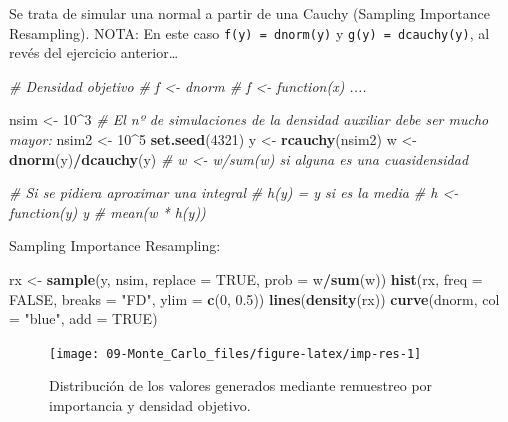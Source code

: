\documentclass[
]{book}
\newenvironment{Shaded}{\begin{snugshade}}{\end{snugshade}}
\newcommand{\CommentTok}[1]{\textcolor[rgb]{0.56,0.35,0.01}{\textit{#1}}}
\newcommand{\DataTypeTok}[1]{\textcolor[rgb]{0.13,0.29,0.53}{#1}}
\newcommand{\DecValTok}[1]{\textcolor[rgb]{0.00,0.00,0.81}{#1}}
\newcommand{\FloatTok}[1]{\textcolor[rgb]{0.00,0.00,0.81}{#1}}
\newcommand{\KeywordTok}[1]{\textcolor[rgb]{0.13,0.29,0.53}{\textbf{#1}}}
\newcommand{\NormalTok}[1]{#1}
\newcommand{\OperatorTok}[1]{\textcolor[rgb]{0.81,0.36,0.00}{\textbf{#1}}}
\newcommand{\OtherTok}[1]{\textcolor[rgb]{0.56,0.35,0.01}{#1}}
\newcommand{\StringTok}[1]{\textcolor[rgb]{0.31,0.60,0.02}{#1}}
\theoremstyle{break}
\theoremstyle{definition}
\theoremstyle{definition}
\theoremstyle{definition}
\theoremstyle{remark}
\begin{document}
Se trata de simular una normal a partir de una Cauchy (Sampling Importance Resampling).
NOTA: En este caso \texttt{f(y)\ =\ dnorm(y)} y \texttt{g(y)\ =\ dcauchy(y)}, al revés del ejercicio anterior\ldots{}

\begin{Shaded}
\begin{Highlighting}[]
\CommentTok{# Densidad objetivo}
\CommentTok{# f <- dnorm # f <- function(x) ....}

\NormalTok{nsim <-}\StringTok{ }\DecValTok{10}\OperatorTok{^}\DecValTok{3}
\CommentTok{# El nº de simulaciones de la densidad auxiliar debe ser mucho mayor:}
\NormalTok{nsim2 <-}\StringTok{ }\DecValTok{10}\OperatorTok{^}\DecValTok{5}
\KeywordTok{set.seed}\NormalTok{(}\DecValTok{4321}\NormalTok{)}
\NormalTok{y <-}\StringTok{ }\KeywordTok{rcauchy}\NormalTok{(nsim2)}
\NormalTok{w <-}\StringTok{ }\KeywordTok{dnorm}\NormalTok{(y)}\OperatorTok{/}\KeywordTok{dcauchy}\NormalTok{(y) }\CommentTok{# w <- w/sum(w) si alguna es una cuasidensidad}

\CommentTok{# Si se pidiera aproximar una integral}
\CommentTok{# h(y) = y si es la media # h <- function(y) y}
\CommentTok{# mean(w * h(y))}
\end{Highlighting}
\end{Shaded}

Sampling Importance Resampling:

\begin{Shaded}
\begin{Highlighting}[]
\NormalTok{rx <-}\StringTok{ }\KeywordTok{sample}\NormalTok{(y, nsim, }\DataTypeTok{replace =} \OtherTok{TRUE}\NormalTok{, }\DataTypeTok{prob =}\NormalTok{ w}\OperatorTok{/}\KeywordTok{sum}\NormalTok{(w))}
\KeywordTok{hist}\NormalTok{(rx, }\DataTypeTok{freq =} \OtherTok{FALSE}\NormalTok{, }\DataTypeTok{breaks =} \StringTok{"FD"}\NormalTok{, }\DataTypeTok{ylim =} \KeywordTok{c}\NormalTok{(}\DecValTok{0}\NormalTok{, }\FloatTok{0.5}\NormalTok{))}
\KeywordTok{lines}\NormalTok{(}\KeywordTok{density}\NormalTok{(rx))}
\KeywordTok{curve}\NormalTok{(dnorm, }\DataTypeTok{col =} \StringTok{"blue"}\NormalTok{, }\DataTypeTok{add =} \OtherTok{TRUE}\NormalTok{)}
\end{Highlighting}
\end{Shaded}

\begin{figure}[!htb]

{\centering \texttt{[image: 09-Monte\_Carlo\_files/figure-latex/imp-res-1]} 

}

\caption{Distribución de los valores generados mediante remuestreo por importancia y densidad objetivo.}\label{fig:imp-res}
\end{figure}
\end{document}
